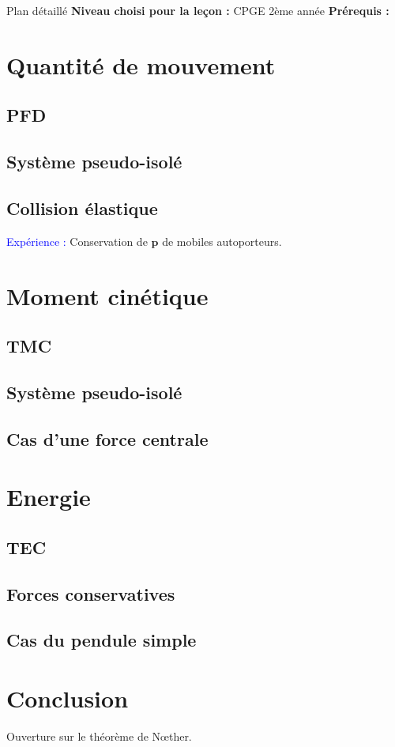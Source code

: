 \begin{reportBlock}{Plan détaillé}
  \textbf{Niveau choisi pour la leçon :} CPGE 2ème année
  \newline
  \textbf{Prérequis : }
  \newline


\section{Quantité de mouvement}

\subsection{PFD}
\subsection{Système pseudo-isolé}
\subsection{Collision élastique}
\textcolor{blue}{Expérience : }Conservation de $\mathbf{p}$ de mobiles autoporteurs.

\section{Moment cinétique}

\subsection{TMC}
\subsection{Système pseudo-isolé}
\subsection{Cas d'une force centrale}

\section{Energie}

\subsection{TEC}
\subsection{Forces conservatives}
\subsection{Cas du pendule simple}

\section*{Conclusion}
Ouverture sur le théorème de N\oe ther.

\end{reportBlock}